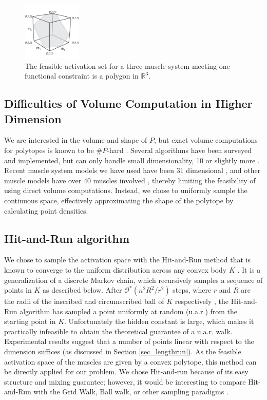 \begin{figure}[t]
  \label{fig:polygon_slice_solution_space}
  \centering
  \includegraphics[width=0.25\textwidth]{sections/figs/feasibleactivation.png}
  \caption{The feasible activation set for a  three-muscle system meeting one functional constraint is a polygon in $\mathbb{R}^3$.} %
\end{figure}

\subsection*{Difficulties of Volume Computation in Higher Dimension}

We are interested in the volume and shape of $P$, but exact volume computations for polytopes is known to be $\#P$-hard \cite{Dyer}.
Several algorithms have been surveyed and implemented, but can only handle small dimensionality, 10 or slightly more \cite{Bueler2}.  
Recent muscle system models we have used have been 31 dimensional \cite{Valero-Cuevas2015high-dimensional}, and other muscle models have over 40 muscles involved \cite{arnold2010model, kutch2012challenges, hamner2010muscle, de2014human}, thereby limiting the feasibility of using direct volume computations. Instead, we chose to uniformly sample the continuous space, effectively approximating the shape of the polytope by calculating point densities.

\subsection*{Hit-and-Run algorithm}
\label{ss:hitrun}
We chose to sample the activation space with the Hit-and-Run method that is known to converge to the uniform distribution across any convex body $K$ \cite{smith1984efficient}.
It is a generalization of a discrete Markov chain, which recursively samples a sequence of points in $K$ as described below.
After $\mathcal{O}^*(n^2R^2/r^2)$ steps, where $r$ and $R$ are the radii of the inscribed and circumscribed ball of $K$ respectively \cite{Dyer, Lovasz}, the Hit-and-Run algorithm has sampled a point uniformly at random (u.a.r.) from the starting point in $K$.
Unfortunately the hidden constant is large, which makes it practically infeasible to obtain the theoretical guarantee of a u.a.r. walk.
Experimental results suggest that a number of points linear with respect to the dimension suffices (as discussed in Section \ref{sec_lengthrun}).
As the feasible activation space of the muscles are given by a convex polytope, this method can be directly applied for our problem.
We chose Hit-and-run because of its easy structure and mixing guarantee; however, it would be interesting to compare Hit-and-Run with the Grid Walk, Ball walk, or other sampling paradigms \cite{Vempala}.

